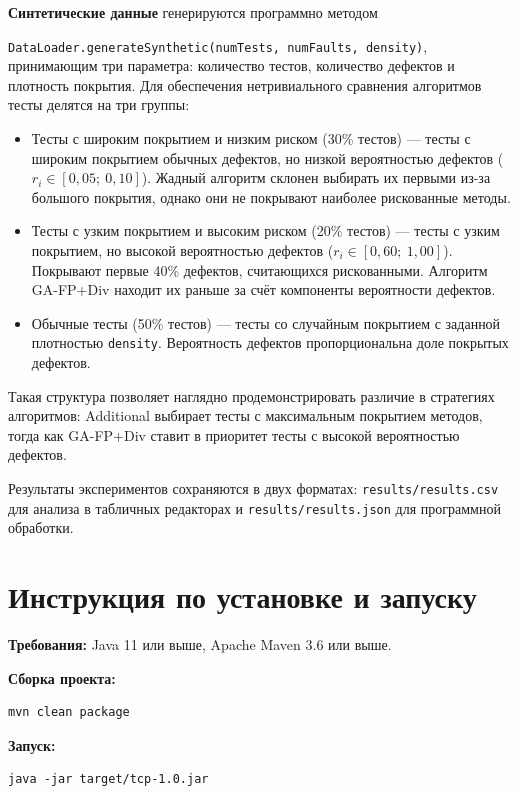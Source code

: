 \textbf{Синтетические данные} генерируются программно методом 

\texttt{DataLoader.generateSynthetic(numTests, numFaults, density)}, 
принимающим три параметра: количество тестов, количество дефектов и плотность покрытия. 
Для обеспечения нетривиального сравнения алгоритмов тесты делятся на три группы:

\begin{itemize}
    \item Тесты с широким покрытием и низким риском (30\% тестов) --- тесты с широким покрытием обычных дефектов, но низкой 
    вероятностью дефектов ($r_i \in [0{,}05;\ 0{,}10]$). Жадный алгоритм склонен выбирать их первыми 
    из-за большого покрытия, однако они не покрывают наиболее рискованные методы.

    \item Тесты с узким покрытием и высоким риском (20\% тестов) --- тесты с узким покрытием, но высокой вероятностью дефектов 
    ($r_i \in [0{,}60;\ 1{,}00]$). Покрывают первые 40\% дефектов, считающихся рискованными. 
    Алгоритм GA-FP+Div находит их раньше за счёт компоненты вероятности дефектов.

    \item Обычные тесты (50\% тестов) --- тесты со случайным покрытием с заданной плотностью 
    \texttt{density}. Вероятность дефектов пропорциональна доле покрытых дефектов.
\end{itemize}

Такая структура позволяет наглядно продемонстрировать различие в стратегиях алгоритмов: 
Additional выбирает тесты с максимальным покрытием методов, тогда как GA-FP+Div ставит в приоритет 
тесты с высокой вероятностью дефектов.

Результаты экспериментов сохраняются в двух форматах: 
\texttt{results/results.csv} для анализа в табличных редакторах и 
\texttt{results/results.json} для программной обработки.

\section{Инструкция по установке и запуску} \label{ch5:sec4}

\textbf{Требования:} Java 11 или выше, Apache Maven 3.6 или выше.

\textbf{Сборка проекта:}
\begin{lstlisting}
mvn clean package
\end{lstlisting}

\textbf{Запуск:}
\begin{lstlisting}
java -jar target/tcp-1.0.jar
\end{lstlisting}

